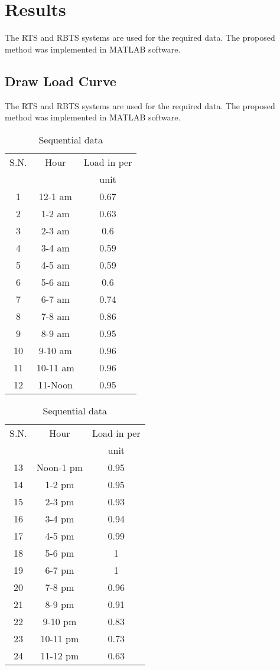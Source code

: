 \documentclass[14 pt]{article}
\begin{document}
\section{Results}
The RTS and RBTS systems are used for the required data. The proposed method
was implemented in MATLAB software.
\subsection{Draw Load Curve}
The RTS and RBTS systems are used for the required data. The proposed method
was implemented in MATLAB software.\\
\begin{table}[!hbt]
\begin{center}
\caption{Sequential data}
\end{center}
\begin{tabular}{|c|c|c|}
\hline 
S.N. & Hour & Load in per  \\ 
 &  & unit \\ 
\hline 
1 & 12-1 am & 0.67 \\ 
\hline 
2 & 1-2 am & 0.63 \\ 
\hline 
3 & 2-3 am & 0.6 \\ 
\hline 
4 & 3-4 am & 0.59 \\ 
\hline 
5 & 4-5 am & 0.59 \\ 
\hline 
6 & 5-6 am & 0.6 \\ 
\hline 
7 & 6-7 am & 0.74 \\ 
\hline 
8 & 7-8 am & 0.86 \\ 
\hline 
9 & 8-9 am & 0.95 \\ 
\hline 
10 & 9-10 am & 0.96 \\ 
\hline 
11 & 10-11 am & 0.96 \\ 
\hline 
12 & 11-Noon & 0.95 \\ 
\hline 
\end{tabular}\hspace{0.2in} 
\begin{tabular}{|c|c|c|}
\hline 
S.N. & Hour & Load in per  \\ 
 &  & unit \\ 
\hline 
 13 & Noon-1 pm & 0.95 \\ 
 \hline 
 14 & 1-2 pm & 0.95 \\ 
 \hline 
 15 & 2-3 pm & 0.93 \\ 
 \hline 
 16 & 3-4 pm & 0.94 \\ 
 \hline 
 17 & 4-5 pm & 0.99 \\ 
 \hline 
 18 & 5-6 pm & 1 \\ 
 \hline 
 19 & 6-7 pm & 1 \\ 
 \hline 
 20 & 7-8 pm & 0.96 \\ 
 \hline 
 21 & 8-9 pm & 0.91 \\ 
 \hline 
 22 & 9-10 pm & 0.83 \\ 
 \hline 
 23 & 10-11 pm & 0.73 \\ 
 \hline 
 24 & 11-12 pm & 0.63 \\ 
 \hline   
\end{tabular} 
\end{table}
\end{document}
